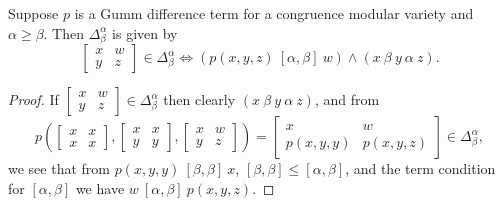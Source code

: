\documentclass[letterpaper,11pt]{article}
\begin{document}
\begin{thm}\label{difference-commutator} Suppose $p$ is a Gumm difference term for a congruence modular variety and $\alpha \ge \beta$. Then $\Delta_\beta^\alpha$ is given by
\[
\begin{bmatrix} x & w\\ y & z\end{bmatrix} \in \Delta_\beta^\alpha \iff (p(x,y,z)\ [\alpha,\beta]\ w) \wedge (x\ \beta\ y\ \alpha\ z).
\]
\end{thm}
\begin{proof} If $\begin{bmatrix} x & w\\ y & z\end{bmatrix} \in \Delta_\beta^\alpha$ then clearly $(x\ \beta\ y\ \alpha\ z)$, and from
\[
p\left(\begin{bmatrix} x & x\\ x & x\end{bmatrix}, \begin{bmatrix} x & x\\ y & y\end{bmatrix}, \begin{bmatrix} x & w\\ y & z\end{bmatrix}\right) = \begin{bmatrix} x & w\\ p(x,y,y) & p(x,y,z)\end{bmatrix} \in \Delta_\beta^\alpha,
\]
we see that from $p(x,y,y)\ [\beta,\beta]\ x$, $[\beta,\beta] \le [\alpha,\beta]$, and the term condition for $[\alpha,\beta]$ we have $w\ [\alpha,\beta]\ p(x,y,z)$.


\end{proof}
\end{document}
